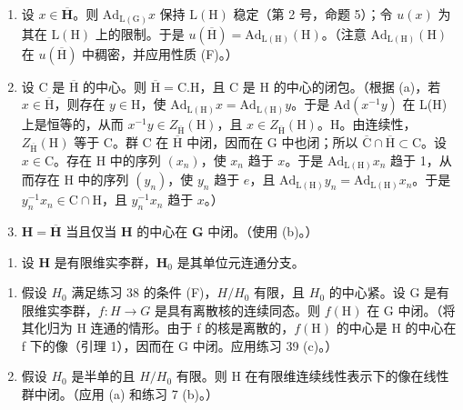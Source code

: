 \begin{enumerate}
\def\labelenumi{(\alph{enumi})}
\item
  设 \(x \in \overline{\mathbf{H}}\)。则 \(\mathrm{Ad}_{\mathrm{L(G)}}x\) 保持 \(\mathrm{L(H)}\) 稳定（第 2 号，命题 5）；令 \(u(x)\) 为其在 \(\mathrm{L(H)}\) 上的限制。于是 \(u(\overline{\mathrm{H}}) = \mathrm{Ad}_{\mathrm{L(H)}}(\mathrm{H})\)。（注意 \(\mathrm{Ad}_{\mathrm{L(H)}}(\mathrm{H})\) 在 \(u(\overline{\mathrm{H}})\) 中稠密，并应用性质 (F)。）
\item
  设 C 是 \(\overline{\mathrm{H}}\) 的中心。则 \(\overline{\mathrm{H}} = \mathrm{C.H}\)，且 C 是 H 的中心的闭包。（根据 (a)，若 \(x \in \overline{\mathrm{H}}\)，则存在 \(y \in \mathrm{H}\)，使 \(\mathrm{Ad}_{\mathrm{L(H)}} x = \mathrm{Ad}_{\mathrm{L(H)}} y\)。于是 \(\mathrm{Ad}(x^{-1}y)\) 在 L(H) 上是恒等的，从而 \(x^{-1}y \in Z_{\overline{\mathrm{H}}}(\mathrm{H})\)，且 \(x \in Z_{\overline{\mathrm{H}}}(\mathrm{H})\)。H。由连续性，\(Z_{\overline{\mathrm{H}}}(\mathrm{H})\) 等于 C。群 C 在 \(\overline{\mathrm{H}}\) 中闭，因而在 G 中也闭；所以 \(\overline{\mathrm{C}} \cap \overline{\mathrm{H}} \subset \mathrm{C}\)。设 \(x \in \mathrm{C}\)。存在 H 中的序列 \((x_n)\)，使 \(x_n\) 趋于 \(x\)。于是 \(\mathrm{Ad}_{\mathrm{L(H)}} x_n\) 趋于 1，从而存在 H 中的序列 \((y_n)\)，使 \(y_n\) 趋于 \(e\)，且 \(\mathrm{Ad}_{\mathrm{L(H)}} y_n = \mathrm{Ad}_{\mathrm{L(H)}} x_n\)。于是 \(y_n^{-1}x_n \in \mathrm{C} \cap \mathrm{H}\)，且 \(y_n^{-1}x_n\) 趋于 \(x\)。）
\item
  \(\mathbf{H} = \overline{\mathbf{H}}\) 当且仅当 \(\mathbf{H}\) 的中心在 \(\mathbf{G}\) 中闭。（使用 (b)。）
\end{enumerate}

\begin{enumerate}
\def\labelenumi{\arabic{enumi}.}
\setcounter{enumi}{39}
\tightlist
\item
  设 \(\mathbf{H}\) 是有限维实李群，\(\mathbf{H}_0\) 是其单位元连通分支。
\end{enumerate}

\begin{enumerate}
\def\labelenumi{(\alph{enumi})}
\item
  假设 \(H_{0}\) 满足练习 38 的条件 (F)，\(H/H_{0}\) 有限，且 \(H_{0}\) 的中心紧。设 G 是有限维实李群，\(f:H\to G\) 是具有离散核的连续同态。则 \(f(\mathrm{H})\) 在 G 中闭。（将其化归为 H 连通的情形。由于 f 的核是离散的，\(f(\mathrm{H})\) 的中心是 H 的中心在 f 下的像（引理 1），因而在 G 中闭。应用练习 39 (c)。）
\item
  假设 \(H_{0}\) 是半单的且 \(H/H_{0}\) 有限。则 H 在有限维连续线性表示下的像在线性群中闭。（应用 (a) 和练习 7 (b)。）
\end{enumerate}

